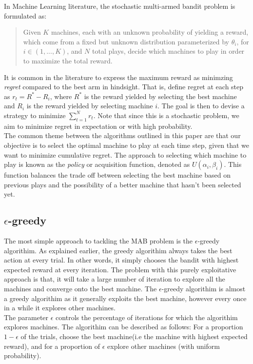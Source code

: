 \documentclass{article}
\begin{document}
In Machine Learning literature, the stochastic multi-armed bandit problem is formulated as:

\begin{quote}
Given $K$ machines, each with an unknown probability of yielding a reward, which come from a fixed but unknown distribution parameterized by $\theta_i$, for $i \in (1, ..., K)$, and $N$ total plays, decide which machines to play in order to maximize the total reward.
\end{quote}

It is common in the literature to express the maximum reward as minimzing \textit{regret} compared to the best arm in hindsight. That is, define regret at each step as $r_{t} = R^* - R_{i}$, where $R^*$ is the reward yielded by selecting the best machine and $R_{i}$ is the reward yielded by selecting machine $i$. The goal is then to devise a strategy to minimize $\sum_{t=1}^N r_{t}$. Note that since this is a stochastic problem, we aim to minimize regret in expectation or with high probability.\\

The common theme between the algorithms outlined in this paper are that our objective is to select the optimal machine to play at each time step, given that we want to minimize cumulative regret. The approach to selecting which machine to play is known as the \textit{policy} or acquisition function, denoted as $U(\alpha_i, \beta_i)$. This function balances the trade off between selecting the best machine based on previous plays and the possibility of a better machine that hasn't been selected yet.

\subsection{$\epsilon$-greedy}

The most simple approach to tackling the MAB problem is the $\epsilon$-greedy algorithim. As explained earlier, the greedy algorithim always takes the best action at every trial. In other words, it simply chooses the bandit with highest expected reward at every iteration. The problem with this purely exploitative approach is that, it will take a large number of iteration to explore all the machines and converge onto the best machine. The $\epsilon$-greedy algorithim is almost a greedy algorithim as it generally exploits the best machine, however every once in a while it explores other machines.\\ 

The parameter $\epsilon$ controls the percentage of iterations for which the algorithim explores machines. The algorithim can be described as follows: For a proportion $1 - \epsilon$ of the trials, choose the best machine(i.e the machine with highest expected reward), and for a proportion of $\epsilon$ explore other machines (with uniform probability).\\
\end{document}
